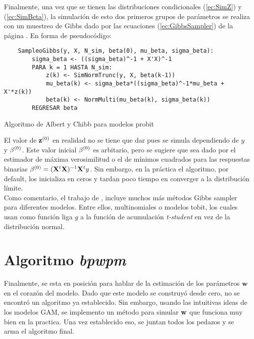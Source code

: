 \documentclass[../Main/Main.tex]{subfiles}
\begin{document}
Finalmente, una vez que se tienen las distribuciones condicionales (\ref{ec:SimZ}) y (\ref{ec:SimBeta}), la simulación de esto dos primeros grupos de parámetros se realiza con un muestreo de Gibbs dado por las ecuaciones (\ref{ec:GibbsSampler}) de la página \pageref{ec:GibbsSampler}. En forma de pseudocódigo:\\
\begin{table}
\makebox[\linewidth]{\rule{\textwidth}{0.4pt}}
\begin{verbatim} 
    SampleoGibbs(y, X, N_sim, beta(0), mu_beta, sigma_beta):
        sigma_beta <- ((sigma_beta)^-1 + X'X)^-1
        PARA k = 1 HASTA N_sim:
            z(k) <- SimNormTrunc(y, X, beta(k-1))
            mu_beta(k) <- sigma_beta*((sigma_beta)^-1*mu_beta + X'*z(k))
            beta(k) <- NormMulti(mu_beta(k), sigma_beta(k)) 
        REGRESAR beta
\end{verbatim}
\makebox[\linewidth]{\rule{\textwidth}{0.4pt}}
\label{alg:SimZBeta}
\caption{Algoritmo de Albert y Chibb para modelos probit}
\end{table}
El valor de $\mathbf{z}^{(0)}$ en realidad no se tiene que dar pues se simula dependiendo de $y$ y $\beta^{(0)}$. Este valor inicial $\beta^{(0)}$ es arbitario, pero se sugiere que sea dado por el estimador de máxima verosimilitud o el de mínimos cuadrados para las respuestas binarias $\beta^{(0)} = (\mathbf{X}^t\mathbf{X})^{-1}\mathbf{X}^ty$. Sin embargo, en la práctica el algoritmo, por default, los inicializa en ceros y tardan poco tiempo en converger a la distribución límite.\\

Como comentario, el trabajo de \autocite{albert1993bayesian}, incluye muchos más métodos Gibbs sampler para diferentes modelos. Entre ellos, multinomiales o modelos tobit, los cuales usan como función liga $g$ a la función de acumulación \textit{t-student} en vez de la distribución normal.   

\section{Algoritmo \textit{bpwpm}}
Finalmente, se esta en posición para hablar de la estimación de los parámetros $\mathbf{w}$ en el corazón del modelo. Dado que este modelo se construyó desde cero, no se encontró un algoritmo ya establecido. Sin embargo, usando las intuitivas ideas de los modelos GAM, se implemento un método para simular $\mathbf{w}$ que funciona muy bien en la practica. Una vez establecido eso, se juntan todos los pedazos y se arma el algoritmo final. 
\end{document}
